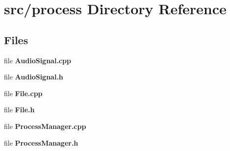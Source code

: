\section{src/process Directory Reference}
\label{dir_c0cd66d8ddae4fc5bc5dc2f24e29763b}
\subsection*{Files}
\begin{DoxyCompactItemize}
\item 
file \textbf{ Audio\+Signal.\+cpp}
\item 
file \textbf{ Audio\+Signal.\+h}
\item 
file \textbf{ File.\+cpp}
\item 
file \textbf{ File.\+h}
\item 
file \textbf{ Process\+Manager.\+cpp}
\item 
file \textbf{ Process\+Manager.\+h}
\end{DoxyCompactItemize}
